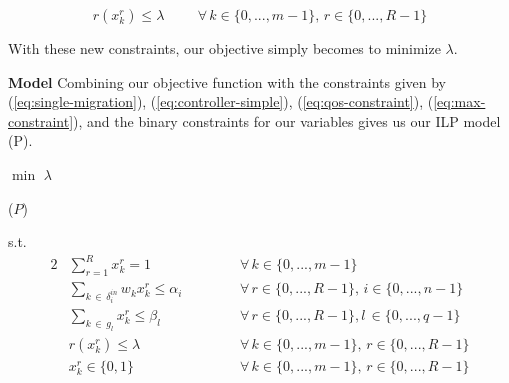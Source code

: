 \documentclass[letterpaper,12pt,titlepage,oneside,final]{article}
\let\oldcenter\center
\let\oldendcenter\endcenter
\renewenvironment{center}{\setlength\topsep{0pt}\oldcenter}{\oldendcenter}
\begin{document}
\begin{equation}\label{eq:max-constraint}
    r(x^{r}_{k}) \leq \lambda \hspace{1cm} \forall \, k \in \{0, ..., m-1\}, \, r \in \{0, ..., R - 1\}
\end{equation}

With these new constraints, our objective simply becomes to minimize $\lambda$.\newline

\noindent\textbf{Model}\newline
\noindent Combining our objective function with the constraints given by (\ref{eq:single-migration}), (\ref{eq:controller-simple}), (\ref{eq:qos-constraint}), (\ref{eq:max-constraint}), and the binary constraints for our variables gives us our ILP model (P).\newline
\newpage

\begin{minipage}{0.8\textwidth}
\begin{center}
    $\min$ $\lambda$
\end{center}
\end{minipage}
\begin{minipage}{0.15\textwidth}
\begin{center}
    ($P$)
\end{center}
\end{minipage}
s.t.
\begin{center}
    \begin{alignat*}{2}
        &\sum_{r=1}^{R} x^{r}_{k} = 1 \hspace{2cm} &&\forall \, k \in \{0, ..., m-1\} \\
        &\sum_{k \, \in \, \delta^{in}_{i}} w_{k}x^{r}_{k} \leq \alpha_{i} &&\forall \, r \in \{0, ..., R-1\}, \, i \in \{0, ..., n-1\}\\
        &\sum_{k \, \in \, g_{l}} x^{r}_{k} \leq \beta_{l} &&\forall \, r \in \{0, ..., R-1\}, l\,  \in \{0, ..., q-1\}\\
        &r(x^{r}_{k}) \leq \lambda &&\forall \, k \in \{0, ..., m - 1\}, \, r \in \{0, ..., R - 1\}\\
        &x^{r}_{k} \in \{0, 1\} &&\forall \, k \in \{0, ..., m - 1\}, \, r \in \{0, ..., R - 1\}
    \end{alignat*}
\end{center}
\end{document}
